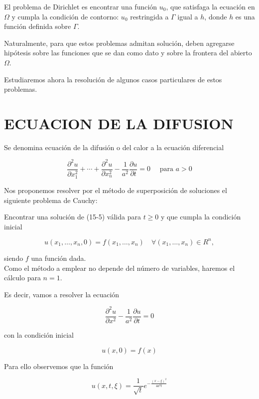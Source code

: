 \documentclass[10pt]{article}
\theoremstyle{plain}
\theoremstyle{definition}
\theoremstyle{remark}
\begin{document}
El problema de Dirichlet es encontrar una función $u_{0}$, que satisfaga la ecuación en $\Omega$ y cumpla la condición de contorno: $u_{0}$ restringida a $\Gamma$ igual a $h$, donde $h$ es una función definida sobre $\Gamma$.

Naturalmente, para que estos problemas admitan solución, deben agregarse hipótesis sobre las funciones que se dan como dato y sobre la frontera del abierto $\Omega$.

Estudiaremos ahora la resolución de algunos casos particulares de estos problemas.

\section*{ECUACION DE LA DIFUSION}
Se denomina ecuación de la difusión o del calor a la ecuación diferencial


\begin{equation*}
\frac{\partial^{2} u}{\partial x_{1}^{2}}+\cdots+\frac{\partial^{2} u}{\partial x_{n}^{2}}-\frac{1}{a^{2}} \frac{\partial u}{\partial t}=0 \quad \text { para } a>0 \tag{15-5}
\end{equation*}


Nos proponemos resolver por el método de superposición de soluciones el siguiente problema de Cauchy:

Encontrar una solución de (15-5) válida para $t \geqslant 0$ y que cumpla la condición inicial

$$
u\left(x_{1}, \ldots, x_{n}, 0\right)=f\left(x_{1}, \ldots, x_{n}\right) \quad \forall\left(x_{1}, \ldots, x_{n}\right) \in R^{n},
$$

siendo $f$ una función dada.\\
Como el método a emplear no depende del número de variables, haremos el cálculo para $n=1$.

Es decir, vamos a resolver la ecuación


\begin{equation*}
\frac{\partial^{2} u}{\partial x^{2}}-\frac{1}{a^{2}} \frac{\partial u}{\partial t}=0 \tag{$15\cdot6$}
\end{equation*}


con la condición inicial

$$
u(x, 0)=f(x)
$$

Para ello observemos que la función


\begin{equation*}
u(x, t, \xi)=\frac{1}{\sqrt{t}} e^{-\frac{(x-\xi)^{2}}{4 a^{2} t}} \tag{15-7}
\end{equation*}
\end{document}
